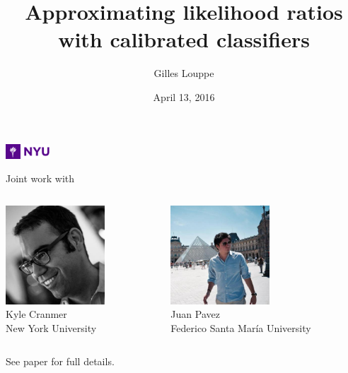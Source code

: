 \documentclass{beamer}
\title{{\bf Approximating likelihood ratios with calibrated classifiers}}
\author{
Gilles Louppe
}
\date{April 13, 2016}
\let\oldcitep=\citep
\renewcommand\citep[1]{\hyperlink{#1}{\oldcitep{#1}}}
\begin{document}
\begin{frame}[plain]
\titlepage
\centering
\includegraphics[height=1.5em]{figures/nyu.jpg}
\end{frame}

\begin{frame}
    \centering
    Joint work with
    \vspace{2em}

    \begin{columns}
      \begin{column}[t]{0.45\textwidth}
        \centering
        \includegraphics[height=10em]{figures/kyle.jpg}\\
        Kyle Cranmer\\
        {\scriptsize New York University}
      \end{column}
      \begin{column}[t]{0.45\textwidth}
          \centering
          \includegraphics[height=10em]{figures/juan.jpg}\\
          Juan Pavez\\
          {\scriptsize Federico Santa Mar\'ia University}
      \end{column}
    \end{columns}

    \vspace{2em}

    See paper \citep{cranmer2015approximating} for full details.
\end{frame}
\end{document}
